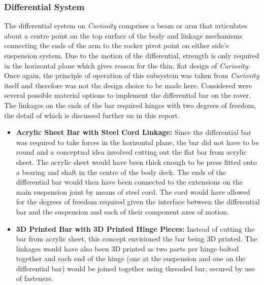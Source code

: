     \subsubsection{Differential System}
      The differential system on \textit{Curiosity} comprises a beam or arm that articulates about a centre point on the top surface of the body and linkage mechanisms connecting the ends of the arm to the rocker pivot point on either side's suspension system. Due to the motion of the differential, strength is only required in the horizontal plane which gives reason for the thin, flat design of \textit{Curiosity}. Once again, the principle of operation of this subsystem was taken from \textit{Curiosity} itself and therefore was not the design choice to be made here. Considered were several possible material options to implement the differential bar on the rover. The linkages on the ends of the bar required hinges with two degrees of freedom, the detail of which is discussed further on in this report.
      
      \begin{itemize}
        \item \textbf{Acrylic Sheet Bar with Steel Cord Linkage:} Since the differential bar was required to take forces in the horizontal plane, the bar did not have to be round and a conceptual idea involved cutting out the flat bar from acrylic sheet. The acrylic sheet would have been thick enough to be press fitted onto a bearing and shaft in the centre of the body deck. The ends of the differential bar would then have been connected to the extensions on the main suspension joint by means of steel cord. The cord would have allowed for the degrees of freedom required given the interface between the differential bar and the suspension and each of their component axes of motion.
        
        \item \textbf{3D Printed Bar with 3D Printed Hinge Pieces:} Instead of cutting the bar from acrylic sheet, this concept envisioned the bar being 3D printed. The linkages would have also been 3D printed as two parts per hinge bolted together and each end of the hinge (one at the suspension and one on the differential bar) would be joined together using threaded bar, secured by use of fasteners.
      \end{itemize}
      
